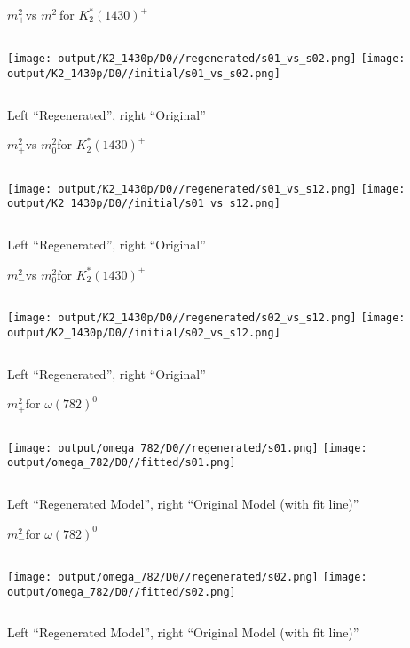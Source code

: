\documentclass{beamer}
\newcommand{\MP}{\ensuremath{m^2_+}}
\newcommand{\MM}{\ensuremath{m^2_-}}
\newcommand{\MZ}{\ensuremath{m^2_0}}
\begin{document}
\begin{frame}{\MP vs \MM for $K_2^*(1430)^+$}
\begin{columns}[t]
\centering
\texttt{[image: output/K2\_1430p/D0//regenerated/s01\_vs\_s02.png]}
\centering
\texttt{[image: output/K2\_1430p/D0//initial/s01\_vs\_s02.png]}
\end{columns}
    \centering
    Left ``Regenerated'', right ``Original''
\end{frame} 


\begin{frame}{\MP vs \MZ for $K_2^*(1430)^+$}
\begin{columns}[t]
\centering
\texttt{[image: output/K2\_1430p/D0//regenerated/s01\_vs\_s12.png]}
\centering
\texttt{[image: output/K2\_1430p/D0//initial/s01\_vs\_s12.png]}
\end{columns}
    \centering
    Left ``Regenerated'', right ``Original''
\end{frame} 


\begin{frame}{\MM vs \MZ for $K_2^*(1430)^+$}
\begin{columns}[t]
\centering
\texttt{[image: output/K2\_1430p/D0//regenerated/s02\_vs\_s12.png]}
\centering
\texttt{[image: output/K2\_1430p/D0//initial/s02\_vs\_s12.png]}
\end{columns}
    \centering
    Left ``Regenerated'', right ``Original''
\end{frame} 

\begin{frame}{\MP for $\omega(782)^0$}
\begin{columns}[t]
\centering
\texttt{[image: output/omega\_782/D0//regenerated/s01.png]}
\centering
\texttt{[image: output/omega\_782/D0//fitted/s01.png]}
\end{columns}
    \centering
    Left ``Regenerated Model'', right ``Original Model (with fit line)''
\end{frame}                   

\begin{frame}{\MM for $\omega(782)^0$}
\begin{columns}[t]
\centering
\texttt{[image: output/omega\_782/D0//regenerated/s02.png]}
\centering
\texttt{[image: output/omega\_782/D0//fitted/s02.png]}
\end{columns}
    \centering
    Left ``Regenerated Model'', right ``Original Model (with fit line)''
\end{frame}                   
\end{document}
